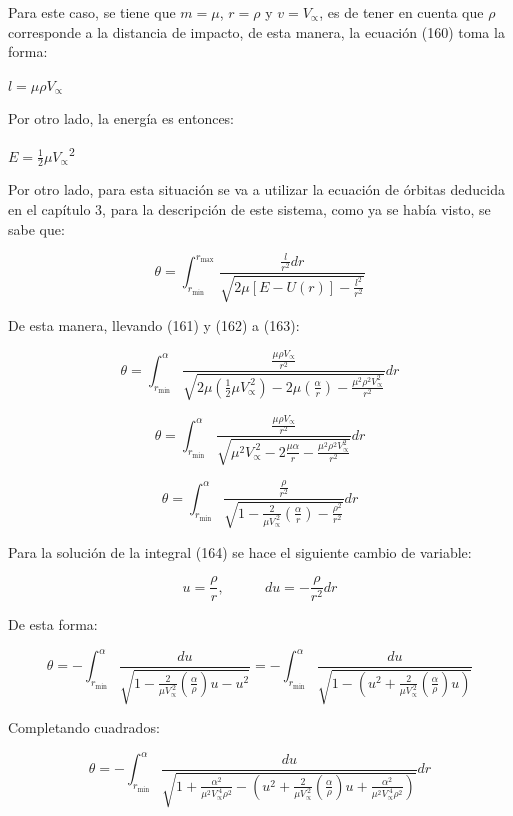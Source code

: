 \documentclass[]{article}
\begin{document}
Para este caso, se tiene que \(m = \mu\), \(r = \rho\) y
\(v = V_{\propto}\), es de tener en cuenta que \(\rho\) corresponde a la
distancia de impacto, de esta manera, la ecuación (160) toma la forma:

\(l = \mu\rho V_{\propto}\)

Por otro lado, la energía es entonces:

\(E = \frac{1}{2}\mu V_{\propto}\)\textsuperscript{2}

Por otro lado, para esta situación se va a utilizar la ecuación de
órbitas deducida en el capítulo 3, para la descripción de este sistema,
como ya se había visto, se sabe que:

\[\theta = \int_{r_{\min}}^{r_{\max}\ }\frac{\frac{l}{r^{2}}dr}{\sqrt{2\mu\left\lbrack E - U(r) \right\rbrack - \frac{l^{2}}{r^{2}}}}\]

De esta manera, llevando (161) y (162) a (163):

\[\theta = \int_{r_{\min}}^{\alpha\ }\frac{\frac{\mu\rho V_{\propto}}{r^{2}}}{\sqrt{2\mu\left( \frac{1}{2}\mu V_{\propto}^{\ 2} \right) - 2\mu\left( \frac{\alpha}{r} \right) - \frac{\mu^{2}\rho^{2}V_{\propto}^{2}}{r^{2}}}}dr\]

\[\theta = \int_{r_{\min}}^{\alpha\ }\frac{\frac{\mu\rho V_{\propto}}{r^{2}}}{\sqrt{\mu^{2}V_{\propto}^{\ 2} - 2\frac{\mu\alpha}{r} - \frac{\mu^{2}\rho^{2}V_{\propto}^{2}}{r^{2}}}}dr\]

\[\theta = \int_{r_{\min}}^{\alpha\ }\frac{\frac{\rho}{r^{2}}}{\sqrt{1 - \frac{2}{\mu V_{\propto}^{\ 2}}\left( \frac{\alpha}{r} \right) - \frac{\rho^{2}}{r^{2}}}}dr\]

Para la solución de la integral (164) se hace el siguiente cambio de
variable:

\[u = \frac{\rho}{r},\ \ \ \ \ \ \ \ \ \ \ \ \ du = - \frac{\rho}{r^{2}}dr\]

De esta forma:

\[\theta = - \int_{r_{\min}}^{\alpha\ }\frac{du}{\sqrt{1 - \frac{2}{\mu V_{\propto}^{\ 2}}\left( \frac{\alpha}{\rho} \right)u - u^{2}}} = - \int_{r_{\min}}^{\alpha\ }\frac{du}{\sqrt{1 - \left( u^{2} + \frac{2}{\mu V_{\propto}^{\ 2}}\left( \frac{\alpha}{\rho} \right)u \right)}}\]

Completando cuadrados:

\[\theta = - \int_{r_{\min}}^{\alpha\ }\frac{du}{\sqrt{1 + \frac{\alpha^{2}}{\mu^{2}V_{\propto}^{\ 4}\rho^{2}} - \left( u^{2} + \frac{2}{\mu V_{\propto}^{\ 2}}\left( \frac{\alpha}{\rho} \right)u + \frac{\alpha^{2}}{\mu^{2}V_{\propto}^{\ 4}\rho^{2}} \right)}}dr\]
\end{document}
